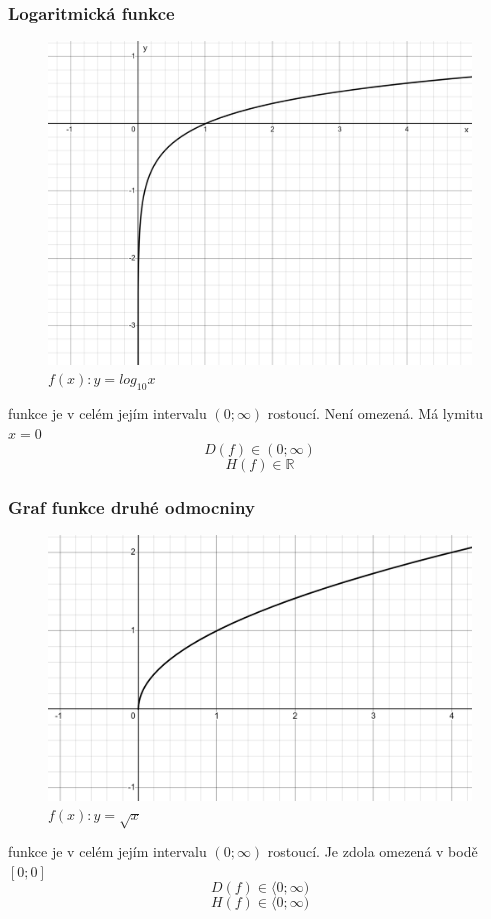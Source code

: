 \subsubsection{Logaritmická funkce}
\begin{figure}[H]
        \centering
        \includegraphics[width=0.5\linewidth]{img/2_logaritmus.png}
        \caption{$f(x): y=log_{10}x$} 
        \label{fig:enter-label}
    \end{figure}
funkce je v celém jejím intervalu $(0;\infty)$ rostoucí. Není omezená. Má lymitu $x=0$
$$
    D(f)\in  (0;\infty)
$$
$$
    H(f)\in\mathbb{R}
$$
\subsubsection{Graf funkce druhé odmocniny}
\begin{figure}[H]
        \centering
        \includegraphics[width=0.5\linewidth]{img/2_odmocnina(x).png}
        \caption{$f(x): y=\sqrt{x}$} 
        \label{fig:enter-label}
    \end{figure}
funkce je v celém jejím intervalu $(0;\infty)$ rostoucí. Je zdola omezená v bodě $[0;0]$
$$
    D(f)\in \langle0;\infty)
$$
$$
    H(f)\in\langle0;\infty)
$$
